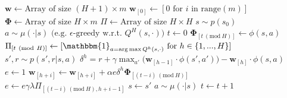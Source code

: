 \begin{appendices}
\begin{algorithm}[H]\small
\caption{\small Linear FHQ($\lambda$) for estimating $Q^H \approx q^H_{*}$}
\label{alg:fhqlambda}
\begin{algorithmic}
\State $\textbf{w} \leftarrow \textrm{Array of size } (H + 1) \times m$
\State $\textbf{w}_{[0]} \leftarrow [0 \textrm{ for } i \textrm{ in } \textrm{range}(m)]$
\State $\bm{\Phi} \leftarrow \textrm{Array of size } H \times m$
\State $\Pi \leftarrow \textrm{Array of size } H \times H$
\State $s \sim p(s_0)$
\State $a \sim \mu(\cdot|s) \textrm{ (e.g. }\epsilon\textrm{-greedy w.r.t. }Q^H(s, \cdot))$
\State $t \leftarrow 0$
    \State $\bm{\Phi}_{[t \ (\mathrm{mod}\ H)]} \leftarrow \phi(s, a)$
    \State $\Pi_{[t \ (\mathrm{mod}\ H)]} \leftarrow [\mathbbm{1}_{a = \argmax{Q^h(s,\cdot)}} \textrm{ for } h \in \{1, ..., H \}]$ %
    \State $s', r \sim p(s', r|s, a)$
        \State $\delta^h = r + \gamma \max_{a'}{\big(\textbf{w}_{[h-1]} \cdot \phi(s', a')\big)} -  \textbf{w}_{[h]} \cdot \phi(s, a)$
        \State $e \leftarrow 1$
            \State $\textbf{w}_{[h+i]} \leftarrow \textbf{w}_{[h+i]} + \alpha e \delta^h \bm{\Phi}_{[(t - i) \ (\mathrm{mod}\ H)]}$
                \State $e \leftarrow e \gamma \lambda \Pi_{[(t - i) \ (\mathrm{mod}\ H), h + i - 1]}$
            \EndIf
        \EndFor
    \EndFor
    \State $s \leftarrow s'$
    \State $a \sim \mu(\cdot | s)$
    \State $t \leftarrow t + 1$
\EndWhile
\end{algorithmic}
\end{algorithm}





\end{appendices}
